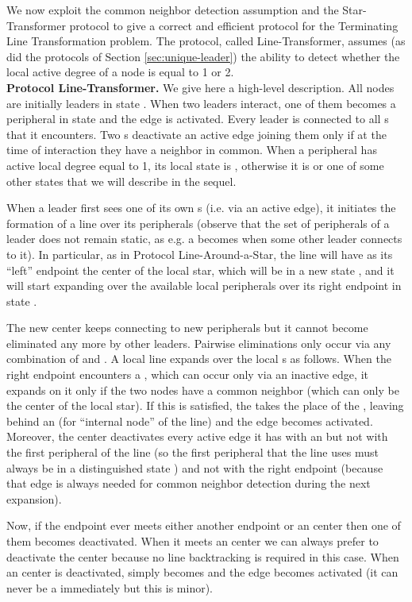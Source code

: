 \documentclass[preprint]{elsarticle}
\begin{document}
We now exploit the common neighbor detection assumption and the Star-Transformer protocol to give a correct and efficient protocol for the Terminating Line Transformation problem. The protocol, called Line-Transformer, assumes (as did the protocols of Section \ref{sec:unique-leader}) the ability to detect whether the local active degree of a node is equal to 1 or 2.\\

\noindent\textbf{Protocol Line-Transformer.} We give here a high-level description. All nodes are initially leaders in state . When two leaders interact, one of them becomes a peripheral in state  and the edge is activated. Every leader is connected to all s that it encounters. Two s deactivate an active edge joining them only if at the time of interaction they have a neighbor in common. When a peripheral has active local degree equal to 1, its local state is , otherwise it is  or one of some other states that we will describe in the sequel.

When a leader first sees one of its own s (i.e. via an active edge), it initiates the formation of a line over its  peripherals (observe that the set of  peripherals of a leader does not remain static, as e.g. a  becomes  when some other leader connects to it). In particular, as in Protocol Line-Around-a-Star, the line will have as its ``left'' endpoint the center of the local star, which will be in a new state , and it will start expanding over the available local  peripherals over its right endpoint in state .

The new center  keeps connecting to new peripherals but it cannot become eliminated any more by other leaders. Pairwise eliminations only occur via any combination of  and . A local line expands over the local s as follows. When the right endpoint  encounters a , which can occur only via an inactive edge, it expands on it only if the two nodes have a common neighbor (which can only be the center of the local star). If this is satisfied, the  takes the place of the , leaving
behind an  (for ``internal node'' of the line) and the edge becomes
activated. Moreover, the center  deactivates every active edge it has
with an  but not with the first peripheral of the line (so the first
peripheral that the line uses must always be in a distinguished state ) and not
with the  right endpoint (because that edge is always needed for common
neighbor detection during the next expansion).

Now, if the  endpoint ever meets either another  endpoint or an 
center then one of them becomes deactivated. When it meets an  center we
can always prefer to deactivate the  center because no line backtracking
is required in this case. When an  center is deactivated,  simply
becomes  and the edge becomes activated (it can never be a 
immediately but this is minor).
\end{document}
